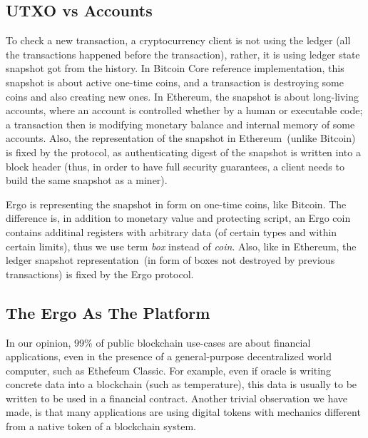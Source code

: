 \subsection{UTXO vs Accounts}
 \label{sec:utxo}

 To check a new transaction, a cryptocurrency client is not using the ledger (all the transactions happened before the
 transaction), rather, it is using ledger state snapshot got from the history. In Bitcoin Core reference implementation,
 this snapshot is about active one-time coins, and a transaction is destroying some coins and also creating new ones.
 In Ethereum, the snapshot is about long-living accounts, where an account is controlled whether by a human or
 executable code; a transaction then is modifying monetary balance and internal memory of some accounts. Also, the
 representation of the snapshot in Ethereum~(unlike Bitcoin) is fixed by the protocol, as authenticating digest of the
 snapshot is written into a block header (thus, in order to have full security guarantees, a client needs to build
 the same snapshot as a miner).

 Ergo is representing the snapshot in form on one-time coins, like Bitcoin. The difference is, in addition to monetary
 value and protecting script, an Ergo coin contains additinal registers with arbitrary data (of certain types and within
 certain limits), thus we use term {\em box} instead of {\em coin}. Also, like in Ethereum, the ledger snapshot
 representation~(in form of boxes not destroyed by previous transactions) is fixed by the Ergo protocol.

\subsection{The Ergo As The Platform}
 \label{sec:platform}

 In our opinion, 99\% of public blockchain use-cases are about financial applications, even in the presence of a
 general-purpose decentralized world computer, such as Ethefeum Classic. For example, even if oracle is writing
 concrete data into a blockchain (such as temperature), this data is usually to be written to be used in a financial
 contract. Another trivial observation we have made, is that many applications are using digital tokens with mechanics
 different from a native token of a blockchain system.

